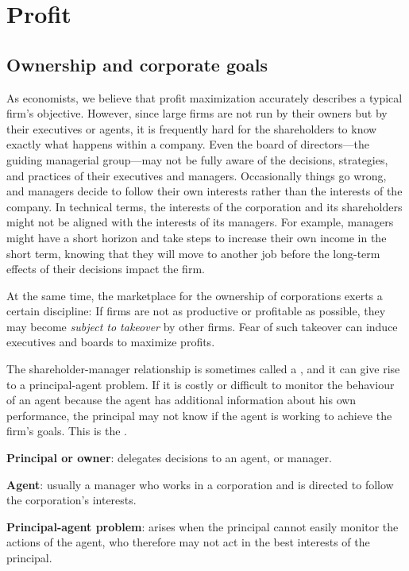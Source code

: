 \section{Profit}\label{sec:ch7sec2}

\subsection*{Ownership and corporate goals}

As economists, we believe that profit maximization accurately describes a
typical firm's objective. However, since large firms are not run by their
owners but by their executives or agents, it is frequently hard for the
shareholders to know exactly what happens within a company. Even the board
of directors---the guiding managerial group---may not be fully aware of the
decisions, strategies, and practices of their executives and managers.
Occasionally things go wrong, and managers decide to follow their own
interests rather than the interests of the company. In technical terms, the
interests of the corporation and its shareholders might not be aligned with
the interests of its managers. For example, managers might have a short
horizon and take steps to increase their own income in the short term,
knowing that they will move to another job before the long-term effects of their
decisions impact the firm.

At the same time, the marketplace for the ownership of corporations exerts a
certain discipline: If firms are not as productive or profitable as
possible, they may become \textit{subject to takeover} by other firms. Fear
of such takeover can induce executives and boards to maximize profits.

The shareholder-manager relationship is sometimes called a
, and it can give rise to a
principal-agent problem. If it is costly or difficult to monitor the
behaviour of an agent because the agent has additional information about his
own performance, the principal may not know if the agent is working to
achieve the firm's goals. This is the .

\begin{DefBox}
\textbf{Principal or owner}: delegates decisions to an agent, or manager.

\textbf{Agent}: usually a manager who works in a corporation and is directed to follow the corporation's interests.

\textbf{Principal-agent problem}: arises when the principal cannot easily monitor the actions of the agent, who therefore may not act in the best interests of the principal.
\end{DefBox}

